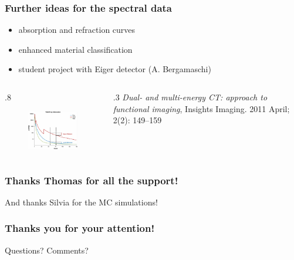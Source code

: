 \documentclass[first,firstsupp]{ETHclass}
\begin{document}
    \begin{frame}
        \frametitle{Further ideas for the spectral data}
        \begin{itemize}
            \item absorption and refraction \alert{curves}
            \item enhanced material classification 
            \item student project with Eiger detector (A. Bergamaschi)
        \end{itemize}
        \begin{columns}
            \begin{column}
                {.8\textwidth}
                \begin{figure}[h]
                    \centering
                    \includegraphics[width=.7\textwidth]{multienergy}
                \end{figure}
            \end{column}
            \begin{column}
                {.3\textwidth}
        \tiny{\emph{Dual- and multi-energy CT: approach to functional imaging},
    Insights Imaging. 2011 April; 2(2): 149–159}
            \end{column}
        \end{columns}
\end{frame}

\begin{frame}
    \frametitle{Thanks Thomas for all the support!}
    And thanks Silvia for the MC simulations!
\end{frame}

\begin{frame}
    \frametitle{Thanks you for your attention!}
    Questions? Comments?
\end{frame}
\end{document}
